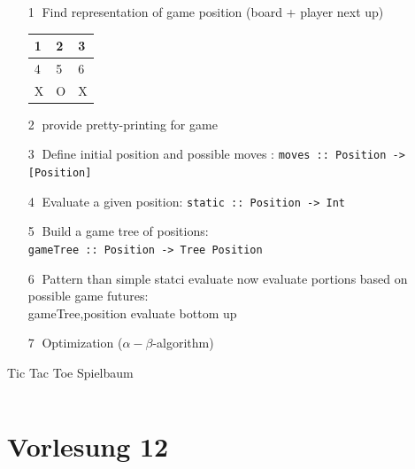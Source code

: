 \documentclass{article}
\newcommand{\Haskell}[1]{\texttt{#1}}
\begin{document}
\begin{enumerate}
\item[\textcircled{1}] Find representation of game position (board + player next up)\\
\begin{tabular}{|l|l|l|}
\hline
1&2&3 \\ \hline
4&5&6 \\ \hline
X&O&X \\ \hline
\end{tabular}
\item[\textcircled{2}]provide pretty-printing for game
\item[\textcircled{3}]Define initial position and possible moves : \Haskell{moves :: Position -> [Position]}
\item[\textcircled{4}] Evaluate a given position: \Haskell{static :: Position -> Int}
\item[\textcircled{5}] Build a game tree of positions:\\
\Haskell{gameTree :: Position -> Tree Position}
\item[\textcircled{6}] Pattern than simple statci evaluate now evaluate portions based on possible game futures:\\
gameTree,position evaluate bottom up
\item[\textcircled{7}] Optimization ($\alpha-\beta$-algorithm)
\end{enumerate}
\begin{listing}
\caption{Tic Tac Toe Spielbaum}
\inputminted{Haskell}{tic-tac-toe.hs}
\end{listing}
\clearpage
\section{Vorlesung 12}
\end{document}
